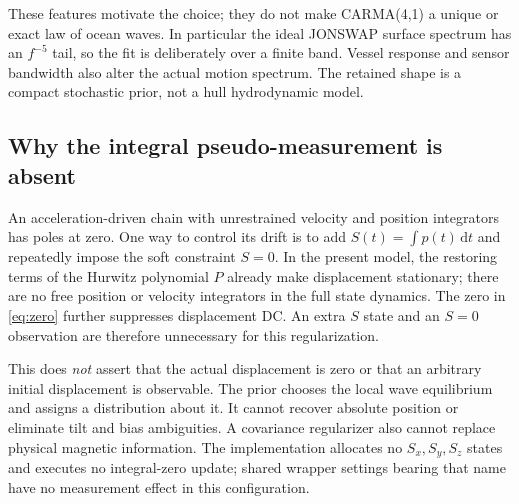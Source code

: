 \documentclass[conference]{IEEEtran}
\newcommand{\dd}{\mathrm d}
\begin{document}
These features motivate the choice; they do not make CARMA(4,1) a unique
or exact law of ocean waves. In particular the ideal JONSWAP surface
spectrum has an $f^{-5}$ tail, so the fit is deliberately over a finite
band. Vessel response and sensor bandwidth also alter the actual motion
spectrum. The retained shape is a compact stochastic prior, not a hull
hydrodynamic model.

\subsection{Why the integral pseudo-measurement is absent}
An acceleration-driven chain with unrestrained velocity and position
integrators has poles at zero. One way to control its drift is to add
$S(t)=\int p(t)\,\dd t$ and repeatedly impose the soft constraint $S=0$.
In the present model, the restoring terms of the Hurwitz polynomial $P$
already make displacement stationary; there are no free position or
velocity integrators in the full state dynamics. The zero in
\cref{eq:zero} further suppresses displacement DC. An extra $S$ state and
an $S=0$ observation are therefore unnecessary for this regularization.

This does \emph{not} assert that the actual displacement is zero or that
an arbitrary initial displacement is observable. The prior chooses the
local wave equilibrium and assigns a distribution about it. It cannot
recover absolute position or eliminate tilt and bias ambiguities. A
covariance regularizer also cannot replace physical magnetic information.
The implementation allocates no $S_x,S_y,S_z$ states and executes no
integral-zero update; shared wrapper settings bearing that name have no
measurement effect in this configuration.
\end{document}
